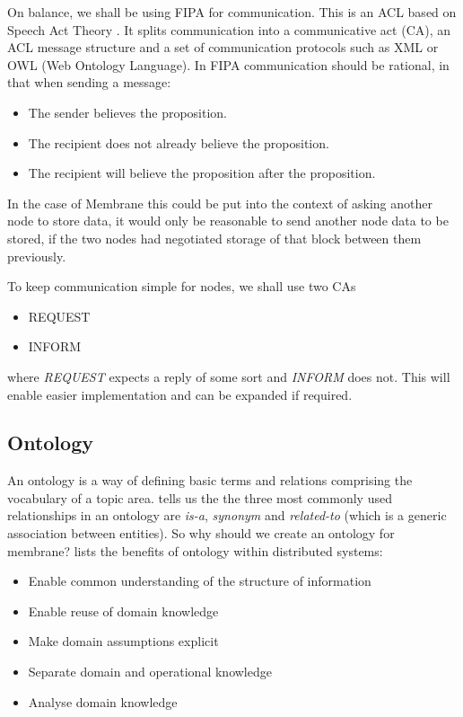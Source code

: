 \documentclass[11pt, a4paper, twocolumn, twoside]{report}
\begin{document}
On balance, we shall be using FIPA for communication. This is an ACL based on Speech Act Theory \citep{labrou1999agent}. It splits communication into a communicative act (CA), an ACL message structure and a set of communication protocols such as XML or OWL (Web Ontology Language). In FIPA communication should be rational, in that when sending a message:
\begin{itemize}
  \item The sender believes the proposition.
  \item The recipient does not already believe the proposition.
  \item The recipient will believe the proposition after the proposition.
\end{itemize}
In the case of Membrane this could be put into the context of asking another node to store data, it would only be reasonable to send another node data to be stored, if the two nodes had negotiated storage of that block between them previously.

To keep communication simple for nodes, we shall use two CAs
\begin{itemize}
  \item REQUEST
  \item INFORM
\end{itemize}
where \emph{REQUEST} expects a reply of some sort and \emph{INFORM} does not. This will enable easier implementation and can be expanded if required.

\subsection{Ontology} \label{sec:ontology}

An ontology is a way of defining basic terms and relations comprising the vocabulary of a topic area. \cite{sugumaran2002ontologies} tells us the the three most commonly used relationships in an ontology are \emph{is-a}, \emph{synonym} and \emph{related-to} (which is a generic association between entities). So why should we create an ontology for membrane? \cite{noy2001ontology} lists the benefits of ontology within distributed systems:

\begin{itemize}
 \item Enable common understanding of the structure of information
 \item Enable reuse of domain knowledge
 \item Make domain assumptions explicit
 \item Separate domain and operational knowledge
 \item Analyse domain knowledge
\end{itemize}
\end{document}
